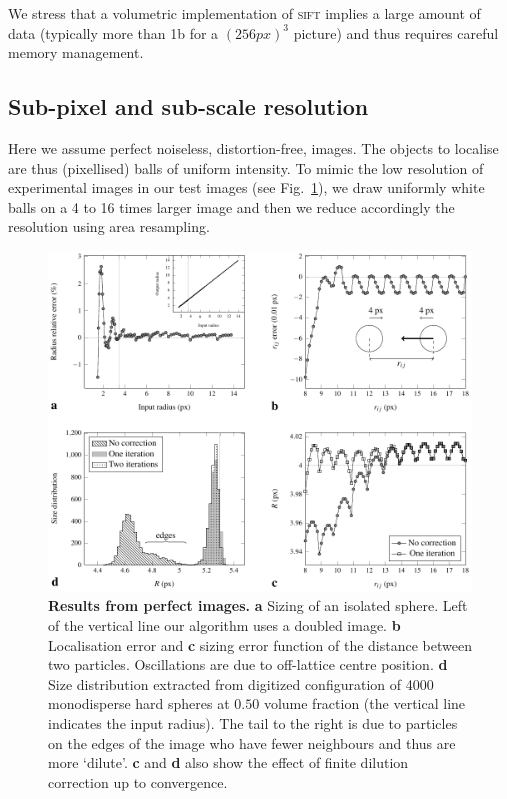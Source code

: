 \documentclass[8.5pt,twoside,twocolumn]{article}
\begin{document}
We stress that a volumetric implementation of \textsc{sift} implies a large amount of data (typically more than \unit{1}{\giga b} for a $(\unit{256}{px})^3$ picture) and thus requires careful memory management.

\subsection{Sub-pixel and sub-scale resolution}

Here we assume perfect noiseless, distortion-free, images. The objects to localise are thus (pixellised) balls of uniform intensity. To mimic the low resolution of experimental images in our test images (see Fig.~\ref{fig:perfect}), we draw uniformly white balls on a 4 to 16 times larger image and then we reduce accordingly the resolution using area resampling.

\begin{figure}
\centering
\includegraphics{fig_perfect.pdf}
	\caption{\textbf{Results from perfect images.} \textbf{a} Sizing of an isolated sphere. Left of the vertical line our algorithm uses a doubled image. \textbf{b} Localisation error and \textbf{c} sizing error function of the distance between two particles. Oscillations are due to off-lattice centre position. \textbf{d} Size distribution extracted from digitized configuration of 4000 monodisperse hard spheres at $0.50$ volume fraction (the vertical line indicates the input radius). The tail to the right is due to particles on the edges of the image who have fewer neighbours and thus are more `dilute'. \textbf{c} and \textbf{d} also show the effect of finite dilution correction up to convergence.}
	\label{fig:perfect}
\end{figure}
\end{document}
